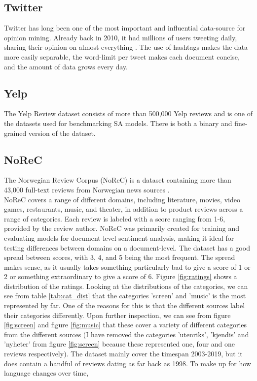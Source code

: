 \subsection{Twitter}
Twitter has long been one of the most important and influential data-source for opinion mining. Already back in 2010, it had millions of users tweeting daily, sharing their opinion on almost everything \cite{pak-paroubek-2010-twitter}. The use of hashtags makes the data more easily separable, the word-limit per tweet makes each document concise, and the amount of data grows every day.
\subsection{Yelp} 
The Yelp Review dataset \cite{zhang2016characterlevel} consists of more than 500,000 Yelp reviews and is one of the datasets used for benchmarking SA models. There is both a binary and fine-grained version of the dataset.


\subsection{NoReC}
The Norwegian Review Corpus (NoReC) is a dataset containing more than 43,000 full-text reviews from Norwegian news sources \cite{VelOvrBer18}.\\
NoReC covers a range of different domains, including literature, movies, video games, restaurants, music, and theater, in addition to product reviews across a range of categories. Each review is labeled with a score ranging from 1-6, provided by the review author. NoReC was primarily created for training and evaluating models for document-level sentiment analysis, making it ideal for testing differences between domains on a document-level. The dataset has a good spread between scores, with 3, 4, and 5 being the most frequent. The spread makes sense, as it usually takes something particularly bad to give a score of 1 or 2 or something extraordinary to give a score of 6. Figure \ref{fig:ratings} shows a distribution of the ratings. Looking at the distributions of the categories, we can see from table \ref{tab:cat_dist} that the categories 'screen' and 'music' is the most represented by far. One of the reasons for this is that the different sources label their categories differently. Upon further inspection, we can see from figure \ref{fig:screen} and figure \ref{fig:music} that these cover a variety of different categories from the different sources (I have removed the categories 'utenriks', 'kjendis' and 'nyheter' from figure \ref{fig:screen} because these represented one, four and one reviews respectively). The dataset mainly cover the timespan 2003-2019, but it does contain a handful of reviews dating as far back as 1998. To make up for how language changes over time, 


